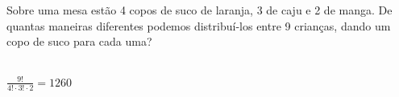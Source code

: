 \begin{ex}
 Sobre uma mesa estão 4 copos de suco de laranja, 3 de caju e 2 de manga. De quantas maneiras diferentes podemos distribuí-los entre 9 crianças, dando um copo de suco para cada uma?
   \begin{sol}
      \phantom{A} \\
      $\frac{9!}{4!\cdot3!\cdot2}=1260$
   \end{sol}
\end{ex}